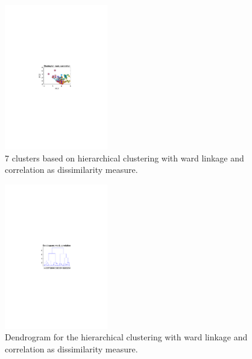 \begin{multicols}{2}
\begin{figure}[H]
    \centering
    \includegraphics[width=0.4\textwidth]{fig/cluster_ward_cor.pdf}
    \caption{7 clusters based on hierarchical clustering with ward linkage and correlation as dissimilarity measure.}
    \label{fig:cluster_ward_cor}
\end{figure}

\begin{figure}[H]
    \centering
    \includegraphics[width=0.4\textwidth]{fig/dendro_ward_cor.pdf}
    \caption{Dendrogram for the hierarchical clustering with ward linkage and correlation as dissimilarity measure.}
    \label{fig:dendro_ward_cor}
\end{figure}

\end{multicols}

